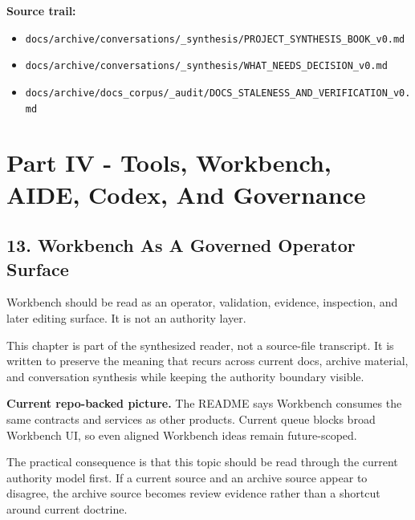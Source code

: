 \documentclass[10.5pt,a4paper,openany]{book}
\begin{document}
\textbf{Source trail:}


\begin{itemize}
\item \texttt{docs/\allowbreak{}archive/\allowbreak{}conversations/\allowbreak{}\_\allowbreak{}synthesis/\allowbreak{}PROJECT\_\allowbreak{}SYNTHESIS\_\allowbreak{}BOOK\_\allowbreak{}v0.\allowbreak{}md}
\item \texttt{docs/\allowbreak{}archive/\allowbreak{}conversations/\allowbreak{}\_\allowbreak{}synthesis/\allowbreak{}WHAT\_\allowbreak{}NEEDS\_\allowbreak{}DECISION\_\allowbreak{}v0.\allowbreak{}md}
\item \texttt{docs/\allowbreak{}archive/\allowbreak{}docs\_\allowbreak{}corpus/\allowbreak{}\_\allowbreak{}audit/\allowbreak{}DOCS\_\allowbreak{}STALENESS\_\allowbreak{}AND\_\allowbreak{}VERIFICATION\_\allowbreak{}v0.\allowbreak{}md}
\end{itemize}


\chapter{Part IV - Tools, Workbench, AIDE, Codex, And Governance}


\section{13. Workbench As A Governed Operator Surface}

Workbench should be read as an operator, validation, evidence, inspection, and later editing surface.\allowbreak{} It is not an authority layer.\allowbreak{}


This chapter is part of the synthesized reader, not a source-\allowbreak{}file transcript.\allowbreak{} It is written to preserve the meaning that recurs across current docs, archive material, and conversation synthesis while keeping the authority boundary visible.\allowbreak{}


\textbf{Current repo-backed picture.} The README says Workbench consumes the same contracts and services as other products.\allowbreak{} Current queue blocks broad Workbench UI, so even aligned Workbench ideas remain future-\allowbreak{}scoped.\allowbreak{}


The practical consequence is that this topic should be read through the current authority model first.\allowbreak{} If a current source and an archive source appear to disagree, the archive source becomes review evidence rather than a shortcut around current doctrine.\allowbreak{}
\end{document}
